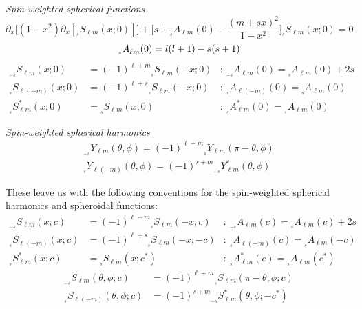 \documentclass[11pt]{article}
\newcommand{\swY}[4][]{{}_{{}_{#2}}\!Y^{#1}_{#3}(#4)}
\newcommand{\swSH}[5][]{{}_{{}_{#2}}S^{#1}_{#3}(#4;#5)}
\newcommand{\swS}[5][]{{}_{{}_{#2}}S^{#1}_{#3}(#4;#5)}
\newcommand{\scA}[4][]{{}_{{}_{#2}}A^{#1}_{#3}(#4)}
\begin{document}
\noindent
{\it Spin-weighted spherical functions}
\begin{equation}
\partial_x \Big[ (1-x^2)\partial_x [\swS{s}{\ell{m}}{x}{0}]\Big] + \bigg[s + \scA{s}{\ell{m}}{0} - \frac{(m+sx)^2}{1-x^2}\bigg]\swS{s}{\ell{m}}{x}{0} = 0
\end{equation}
\begin{equation}
\scA{s}{\ell{m}}{0} = l(l+1) - s(s+1)\\
\end{equation}
\begin{align}
\swS{-s}{\ell{m}}{x}{0} &= (-1)^{\ell+m}\swS{s}{\ell{m}}{-x}{0} 
           &:\ \scA{-s}{\ell{m}}{0} = \scA{s}{\ell{m}}{0} + 2s \\
\swS{s}{\ell(-m)}{x}{0} &= (-1)^{\ell+s}\swS{s}{\ell{m}}{-x}{0} 
           &:\ \scA{s}{\ell(-m)}{0} = \scA{s}{\ell{m}}{0} \\
\swS[*]{s}{\ell{m}}{x}{0} &= \swS{s}{\ell{m}}{x}{0} 
           &:\ \scA[*]{s}{\ell{m}}{0} = \scA{s}{\ell{m}}{0}
\end{align}

\noindent
{\it Spin-weighted spherical harmonics}
\begin{align}\label{eqn:swYminuss}
\swY{-s}{\ell{m}}{\theta,\phi}=(-1)^{\ell+m}\swY{s}{\ell{m}}{\pi-\theta,\phi} \\ \label{eqn:swYminusm}
\swY{s}{\ell(-m)}{\theta,\phi}=(-1)^{s+m}\swY[*]{-s}{\ell{m}}{\theta,\phi}
\end{align}

\noindent
These leave us with the following conventions for the spin-weighted spherical harmonics and spheroidal functions:
\begin{align}
\swS{-s}{\ell{m}}{x}{c} &= (-1)^{\ell+m}\swS{s}{\ell{m}}{-x}{c} 
           &:\ \scA{-s}{\ell{m}}{c} = \scA{s}{\ell{m}}{c} + 2s \\
\swS{s}{\ell(-m)}{x}{c} &= (-1)^{\ell+s}\swS{s}{\ell{m}}{-x}{-c} 
           &:\ \scA{s}{\ell(-m)}{c} = \scA{s}{\ell{m}}{-c} \\
\swS[*]{s}{\ell{m}}{x}{c} &= \swS{s}{\ell{m}}{x}{c^*} 
           &:\ \scA[*]{s}{\ell{m}}{c} = \scA{s}{\ell{m}}{c^*}
\end{align}
\begin{align}\label{eqn:swSHminuss}
\swSH{-s}{\ell{m}}{\theta,\phi}{c} &= (-1)^{\ell+m}\swSH{s}{\ell{m}}{\pi-\theta,\phi}{c} \\ \label{eqn:swSHminusm}
\swSH{s}{\ell(-m)}{\theta,\phi}{c} &= (-1)^{s+m}\swSH[*]{-s}{\ell{m}}{\theta,\phi}{-c^*}
\end{align}
\end{document}
